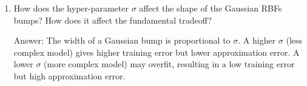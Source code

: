 \documentclass{article}
\newenvironment{answer}{\par\begingroup\color{gre}Answer: }{\endgroup}
\begin{document}
\begin{enumerate}
\item How does the hyper-parameter $\sigma$ affect the shape of the Gaussian RBFs bumps? How does it affect the fundamental tradeoff?
\begin{answer}
    The width of a Gaussian bump is proportional to $\sigma$. A higher $\sigma$ (less complex model) gives higher training error but lower approximation error. A lower $\sigma$ (more complex model) may overfit, resulting in a low training error but high approximation error.
\end{answer}

\end{enumerate}
\end{document}
